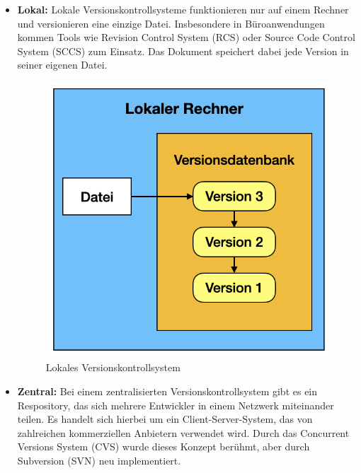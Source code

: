 \begin{itemize}
	\item \textbf{Lokal:} Lokale Versionskontrollsysteme funktionieren nur auf einem Rechner und versionieren eine einzige Datei. Insbesondere in Büroanwendungen kommen Tools wie Revision Control System (RCS) oder Source Code Control System (SCCS) zum Einsatz. Das Dokument speichert  dabei jede Version in seiner eigenen Datei.
	
	\begin{figure}[H]
	\begin{center}
		\includegraphics[scale=.65]{images/local_vcs.png}
	\end{center}
		\caption{Lokales Versionskontrollsystem}
	\end{figure}
	
	\item \textbf{Zentral:} Bei einem zentralisierten Versionskontrollsystem gibt es ein Respository, das sich mehrere 		Entwickler in einem Netzwerk miteinander teilen. Es handelt sich hierbei um ein Client-Server-System, das 		von zahlreichen kommerziellen Anbietern verwendet wird. Durch das Concurrent Versions System (CVS) 			wurde dieses Konzept berühmt, aber durch Subversion (SVN) neu implementiert.
	

\end{itemize}
